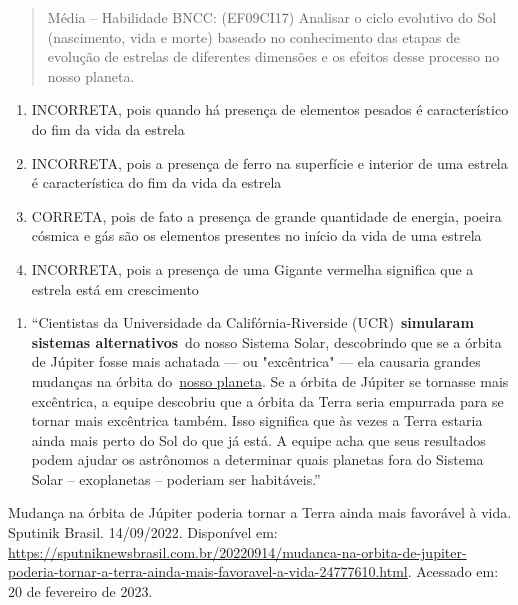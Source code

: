 \begin{quote}
Média -- Habilidade BNCC: (EF09CI17) Analisar o ciclo evolutivo do Sol
(nascimento, vida e morte) baseado no conhecimento das etapas de
evolução de estrelas de diferentes dimensões e os efeitos desse processo
no nosso planeta.
\end{quote}

\begin{enumerate}
\def\labelenumi{(\Alph{enumi})}
\item
  INCORRETA, pois quando há presença de elementos pesados é
  característico do fim da vida da estrela
\item
  INCORRETA, pois a presença de ferro na superfície e interior de uma
  estrela é característica do fim da vida da estrela
\item
  CORRETA, pois de fato a presença de grande quantidade de energia,
  poeira cósmica e gás são os elementos presentes no início da vida de
  uma estrela
\item
  INCORRETA, pois a presença de uma Gigante vermelha significa que a
  estrela está em crescimento
\end{enumerate}

\begin{enumerate}
\def\labelenumi{\arabic{enumi})}
\item
  ``Cientistas da Universidade da Califórnia-Riverside
  (UCR)~\textbf{simularam sistemas alternativos}~do nosso Sistema Solar,
  descobrindo que se a órbita de Júpiter fosse mais achatada --- ou
  "excêntrica" --- ela causaria grandes mudanças na órbita
  do~\href{https://sputniknewsbrasil.com.br/20220905/cientistas-revelam-cenarios-em-que-a-terra-poderia-deixar-o-sistema-solar-24586992.html}{nosso
  planeta}. Se a órbita de Júpiter se tornasse mais excêntrica, a equipe
  descobriu que a órbita da Terra seria empurrada para se tornar mais
  excêntrica também. Isso significa que às vezes a Terra estaria ainda
  mais perto do Sol do que já está. A equipe acha que seus resultados
  podem ajudar os astrônomos a determinar quais planetas fora do Sistema
  Solar -- exoplanetas -- poderiam ser habitáveis.''
\end{enumerate}

Mudança na órbita de Júpiter poderia tornar a Terra ainda mais favorável
à vida. Sputinik Brasil. 14/09/2022. Disponível em:
\url{https://sputniknewsbrasil.com.br/20220914/mudanca-na-orbita-de-jupiter-poderia-tornar-a-terra-ainda-mais-favoravel-a-vida-24777610.html}.
Acessado em: 20 de fevereiro de 2023.

